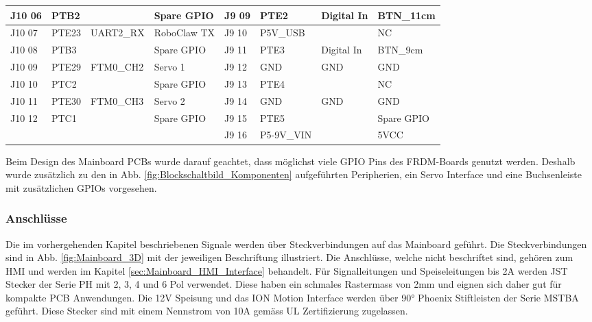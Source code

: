 \begin{table}[H]
\begin{tabular}{|r|r|r|r|l|l|r|l|}
		\hline
		\multicolumn{1}{|l|}{J10 06} & \multicolumn{1}{l|}{PTB2 } &       & \multicolumn{1}{l|}{Spare GPIO} & J9 09 & PTE2  & \multicolumn{1}{l|}{Digital In} & BTN\_11cm \\
		\hline
		\multicolumn{1}{|l|}{J10 07} & \multicolumn{1}{l|}{PTE23} & \multicolumn{1}{l|}{UART2\_RX} & \multicolumn{1}{l|}{RoboClaw TX} & J9 10 & P5V\_USB &       & NC \\
		\hline
		\multicolumn{1}{|l|}{J10 08} & \multicolumn{1}{l|}{PTB3 } &       & \multicolumn{1}{l|}{Spare GPIO} & J9 11 & PTE3  & \multicolumn{1}{l|}{Digital In} & BTN\_9cm \\
		\hline
		\multicolumn{1}{|l|}{J10 09} & \multicolumn{1}{l|}{PTE29} & \multicolumn{1}{l|}{FTM0\_CH2} & \multicolumn{1}{l|}{Servo 1} & J9 12 & GND   & \multicolumn{1}{l|}{GND} & GND \\
		\hline
		\multicolumn{1}{|l|}{J10 10} & \multicolumn{1}{l|}{PTC2} &       & \multicolumn{1}{l|}{Spare GPIO} & J9 13 & PTE4  &       & NC \\
		\hline
		\multicolumn{1}{|l|}{J10 11} & \multicolumn{1}{l|}{PTE30} & \multicolumn{1}{l|}{FTM0\_CH3} & \multicolumn{1}{l|}{Servo 2} & J9 14 & GND   & \multicolumn{1}{l|}{GND} & GND \\
		\hline
		\multicolumn{1}{|l|}{J10 12} & \multicolumn{1}{l|}{PTC1} &       & \multicolumn{1}{l|}{Spare GPIO} & J9 15 & PTE5  &       & Spare GPIO \\
		\hline
		&       &       &       & J9 16 & P5-9V\_VIN &       & 5VCC \\
		\hline
	\end{tabular}%
	\label{tab:FRDM_Port_Mapping}%
\end{table}%

Beim Design des Mainboard PCBs wurde darauf geachtet, dass möglichst viele GPIO Pins des FRDM-Boards genutzt werden. Deshalb wurde zusätzlich zu den in Abb. \ref{fig:Blockschaltbild_Komponenten} aufgeführten Peripherien, ein Servo Interface und eine Buchsenleiste mit zusätzlichen GPIOs vorgesehen.

\subsubsection{Anschlüsse}
Die im vorhergehenden Kapitel beschriebenen Signale werden über Steckverbindungen auf das Mainboard geführt. Die Steckverbindungen sind in Abb. \ref{fig:Mainboard_3D} mit der jeweiligen Beschriftung illustriert. Die Anschlüsse, welche nicht beschriftet sind, gehören zum HMI und werden im Kapitel \ref{sec:Mainboard_HMI_Interface} behandelt. Für Signalleitungen und Speiseleitungen bis 2A werden JST Stecker der Serie PH mit 2, 3, 4 und 6 Pol verwendet. Diese haben ein schmales Rastermass von 2mm und eignen sich daher gut für kompakte PCB Anwendungen. Die 12V Speisung und das ION Motion Interface werden über 90° Phoenix Stiftleisten der Serie MSTBA geführt. Diese Stecker sind mit einem Nennstrom von 10A gemäss UL Zertifizierung zugelassen.

